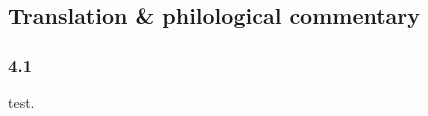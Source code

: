 


\pagestyle{HPed}
\begin{ekdosis}

\chapter*{Translation \& philological commentary}
\subsection*{4.1}
\begin{translation}[hp04_001]
test.
\end{translation}

\end{ekdosis}

